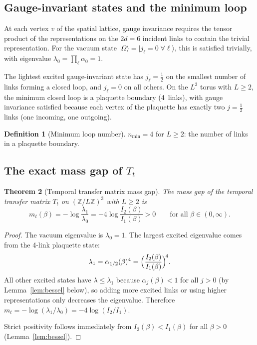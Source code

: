 \documentclass[11pt]{article}
\newtheorem{theorem}{Theorem}[section]
\theoremstyle{definition}
\newtheorem{definition}[theorem]{Definition}
\newcommand{\Z}{\mathbb{Z}}
\begin{document}
\subsection{Gauge-invariant states and the minimum loop}

At each vertex $v$ of the spatial lattice, gauge invariance requires
the tensor product of the representations on the $2d=6$ incident links
to contain the trivial representation.  For the vacuum state
$|\Omega\rangle=|j_\ell=0\;\forall\ell\rangle$, this is satisfied
trivially, with eigenvalue $\lambda_0=\prod_\ell\alpha_0=1$.

The lightest excited gauge-invariant state has
$j_\ell=\frac{1}{2}$ on the smallest number of links forming a closed
loop, and $j_\ell=0$ on all others.  On the $L^3$ torus with $L\ge 2$,
the minimum closed loop is a plaquette boundary (4~links), with
gauge invariance satisfied because each vertex of the plaquette has
exactly two $j=\frac{1}{2}$ links (one incoming, one outgoing).

\begin{definition}[Minimum loop number]
$n_{\min}=4$ for $L\ge 2$: the number of links in a plaquette boundary.
\end{definition}

\subsection{The exact mass gap of $T_t$}

\begin{theorem}[Temporal transfer matrix mass gap]\label{thm:Tt}
The mass gap of the temporal transfer matrix $T_t$ on $(\Z/L\Z)^3$
with $L\ge 2$ is
\begin{equation}\label{eq:mTt}
m_t(\beta)=-\log\frac{\lambda_1}{\lambda_0}
=-4\log\frac{I_2(\beta)}{I_1(\beta)}>0
\qquad\text{for all }\beta\in(0,\infty).
\end{equation}
\end{theorem}

\begin{proof}
The vacuum eigenvalue is $\lambda_0=1$.  The largest excited eigenvalue
comes from the 4-link plaquette state:
\begin{equation}
\lambda_1=\alpha_{1/2}(\beta)^4=\Bigl(\frac{I_2(\beta)}{I_1(\beta)}\Bigr)^{\!4}.
\end{equation}
All other excited states have $\lambda\le\lambda_1$ because
$\alpha_j(\beta)<1$ for all $j>0$ (by Lemma~\ref{lem:bessel} below),
so adding more excited links or using higher representations only
decreases the eigenvalue.  Therefore
$m_t=-\log(\lambda_1/\lambda_0)=-4\log(I_2/I_1)$.

Strict positivity follows immediately from $I_2(\beta)<I_1(\beta)$
for all $\beta>0$ (Lemma~\ref{lem:bessel}).
\end{proof}
\end{document}
